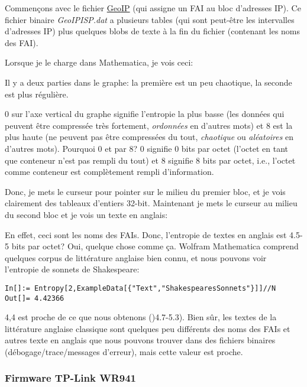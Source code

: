 Commençons avec le fichier \href{https://www.maxmind.com/en/geoip-demo}{GeoIP} (qui
assigne un FAI au bloc d'adresses IP).
Ce fichier binaire \emph{GeoIPISP.dat} a plusieurs tables (qui sont peut-être les
intervalles d'adresses IP) plus quelques blobs de texte à la fin du fichier (contenant
les noms des FAI).

Lorsque je le charge dans Mathematica, je vois ceci:



Il y a deux parties dans le graphe: la première est un peu chaotique, la seconde
est plus régulière.

0 sur l'axe vertical du graphe signifie l'entropie la plus basse (les données
qui peuvent être compressée très fortement, \emph{ordonnées} en d'autres mots) et 8
est la plus haute (ne peuvent pas être compressées du tout, \emph{chaotique}
ou \emph{aléatoires} en d'autres mots).
Pourquoi 0 et par 8? 0 signifie 0 bits par octet (l'octet en tant que conteneur
n'est pas rempli du tout) et 8 signifie 8 bits par octet, i.e., l'octet comme
conteneur est complètement rempli d'information.

Donc, je mets le curseur pour pointer sur le milieu du premier bloc, et je vois clairement
des tableaux d'entiers 32-bit.
Maintenant je mets le curseur au milieu du second bloc et je vois un texte en anglais:



En effet, ceci sont les noms des FAIs.
Donc, l'entropie de textes en anglais est 4.5-5 bits par octet? Oui, quelque chose
comme ça.
Wolfram Mathematica comprend quelques corpus de littérature anglaise bien connu,
et nous pouvons voir l'entropie de sonnets de Shakespeare:

\begin{lstlisting}[style=custommath]
In[]:= Entropy[2,ExampleData[{"Text","ShakespearesSonnets"}]]//N
Out[]= 4.42366
\end{lstlisting}

4,4 est proche de ce que nous obtenons ()4.7-5.3).
Bien sûr, les textes de la littérature anglaise classique sont quelques peu différents
des noms des FAIs et autres texte en anglais que nous pouvons trouver dans des fichiers
binaires (débogage/trace/messages d'erreur), mais cette valeur est proche.

\subsubsection{Firmware TP-Link WR941 }

